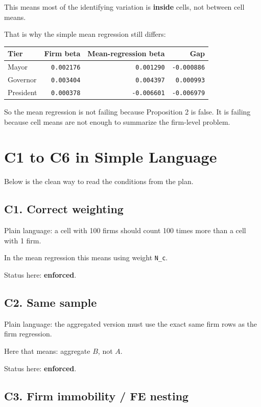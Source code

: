 \documentclass[11pt]{article}
\begin{document}
This means most of the identifying variation is \textbf{inside} cells, not between cell means.

That is why the simple mean regression still differs:

\begin{center}
\begin{tabular}{lrrr}
\toprule
Tier & Firm beta & Mean-regression beta & Gap \\
\midrule
Mayor & \texttt{0.002176} & \texttt{0.001290} & \texttt{-0.000886} \\
Governor & \texttt{0.003404} & \texttt{0.004397} & \texttt{0.000993} \\
President & \texttt{0.000378} & \texttt{-0.006601} & \texttt{-0.006979} \\
\bottomrule
\end{tabular}
\end{center}

So the mean regression is not failing because Proposition 2 is false. It is failing because cell means are not enough to summarize the firm-level problem.

\section{C1 to C6 in Simple Language}

Below is the clean way to read the conditions from the plan.

\subsection*{C1. Correct weighting}

Plain language: a cell with 100 firms should count 100 times more than a cell with 1 firm.

In the mean regression this means using weight \texttt{N\_c}.

Status here: \textbf{enforced}.

\subsection*{C2. Same sample}

Plain language: the aggregated version must use the exact same firm rows as the firm regression.

Here that means: aggregate $B$, not $A$.

Status here: \textbf{enforced}.

\subsection*{C3. Firm immobility / FE nesting}
\end{document}
